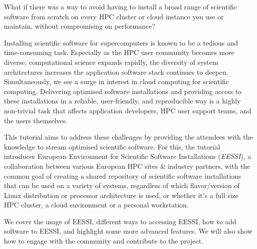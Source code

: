 What if there was a way to avoid having to install a broad range of scientific software from scratch on every HPC
cluster or cloud instance you use or maintain, without compromising on performance?

Installing scientific software for supercomputers is known to be a tedious and time-consuming task. Especially as the
HPC user community becomes more diverse, computational science expands rapidly, the diversity of system architectures
increases the application software stack continues to deepen. Simultaneously, we see a surge in interest in cloud
computing for scientific computing. Delivering optimised software installations and providing access to these
installations in a reliable, user-friendly, and reproducible way is a highly non-trivial task that affects application
developers, HPC user support teams, and the users themselves.

This tutorial aims to address these challenges by providing the attendees with the knowledge to stream optimised
scientific software. For this, the tutorial introduces European Environment for Scientific Software Installations
(\emph{EESSI}), a collaboration between various European HPC sites \& industry partners, with the common goal of
creating a shared repository of scientific software installations that can be used on a variety of systems, regardless
of which flavor/version of Linux distribution or processor architecture is used, or whether it’s a full size HPC
cluster, a cloud environment or a personal workstation.

We cover the usage of EESSI, different ways to accessing EESSI, how to add software to EESSI, and highlight some more 
advanced features. We will also show how to engage with the community and contribute to the project.

